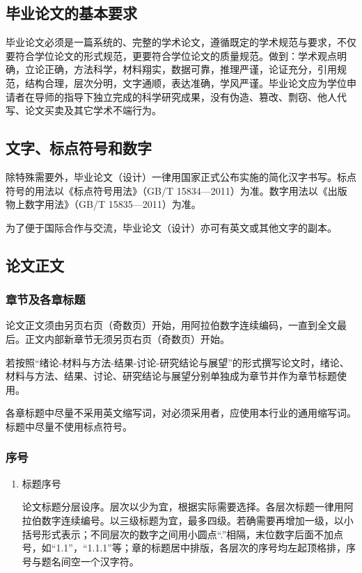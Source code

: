 {\subsection{毕业论文的基本要求}
毕业论文必须是一篇系统的、完整的学术论文，遵循既定的学术规范与要求，不仅要符合学位论文的形式规范，更要符合学位论文的质量规范。做到：学术观点明确，立论正确，方法科学，材料翔实，数据可靠，推理严谨，论证充分，引用规范，结构合理，层次分明，文字通顺，表达准确，学风严谨。毕业论文应为学位申请者在导师的指导下独立完成的科学研究成果，没有伪造、篡改、剽窃、他人代写、论文买卖及其它学术不端行为。


\subsection{文字、标点符号和数字}

除特殊需要外，毕业论文（设计）一律用国家正式公布实施的简化汉字书写。标点符号的用法以《标点符号用法》（GB/T 15834—2011）为准。数字用法以《出版物上数字用法》（GB/T 15835—2011）为准。

为了便于国际合作与交流，毕业论文（设计）亦可有英文或其他文字的副本。

\subsection{论文正文}

\subsubsection{章节及各章标题}
论文正文须由另页右页（奇数页）开始，用阿拉伯数字连续编码，一直到全文最后。正文内部新章节无须另页右页（奇数页）开始。

若按照“绪论-材料与方法-结果-讨论-研究结论与展望”的形式撰写论文时，绪论、材料与方法、结果、讨论、研究结论与展望分别单独成为章节并作为章节标题使用。

各章标题中尽量不采用英文缩写词，对必须采用者，应使用本行业的通用缩写词。标题中尽量不使用标点符号。

\subsubsection{序号}
\begin{enumerate}
    \item 标题序号

论文标题分层设序。层次以少为宜，根据实际需要选择。各层次标题一律用阿拉伯数字连续编号。以三级标题为宜，最多四级。若确需要再增加一级，以小括号形式表示；不同层次的数字之间用小圆点“.”相隔，末位数字后面不加点号，如“1.1”，“1.1.1”等；章的标题居中排版，各层次的序号均左起顶格排，序号与题名间空一个汉字符。


\end{enumerate}}
